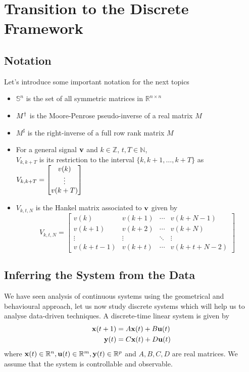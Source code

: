\section{Transition to the Discrete Framework}%
\subsection*{Notation}
Let's introduce some important notation for the next topics
\begin{itemize}
\item $\mathbb{S}^n$ is the set of all symmetric matrices in $\mathbb{R}^{n\times n}$
\item $M^\dagger$ is the Moore-Penrose pseudo-inverse of a real matrix $M$
\item $M^{\sharp}$ is the right-inverse of a full row rank matrix $M$
\item For a general signal $\mathbf{v}$ and $k\in \mathbb{Z}$, $t, T\in \mathbb{N}$,\\
$V_{k, k+T}$ is its restriction to the interval $\{k,k+1,\ldots,k+T\}$ as $V_{k, k+T}=\begin{bmatrix} v(k)\\\vdots \\v( k+T)\end{bmatrix}$
\item $V_{k,t,N}$ is the Hankel matrix associated to $\mathbf{v}$ given by
\[V_{k,t,N}
=
\begin{bmatrix}
v(k) & v(k+1) & \cdots & v(k+N-1)\\
v(k+1) & v(k+2) & \cdots & v(k+N)\\
\vdots & \vdots & \ddots & \vdots\\
v(k+t-1) & v(k+t)  & \cdots & v(k+t+N-2)
\end{bmatrix}\]
\end{itemize}
\subsection{Inferring the System from the Data}
We have seen analysis of continuous systems using the geometrical and behavioural approach, let us now study discrete systems which will help us to analyse data-driven techniques. A discrete-time linear system is given by
\begin{subequations}\label{ch5:e:lin-sys}
\begin{align}
\bmx(t+1)&=A \bmx(t)+B \bmu(t)\label{lin.sys.1}\\
\bmy(t)&=C \bmx(t)+D \bmu(t)\label{lin.sys.2}
\end{align}
\end{subequations}
where $\mathbf{x}(t)\in\mathbb{R}^n, \mathbf{u}(t)\in\mathbb{R}^m, \mathbf{y}(t)\in\mathbb{R}^p$ and $A,B,C,D$ are real matrices. We assume that the system is controllable and observable.

